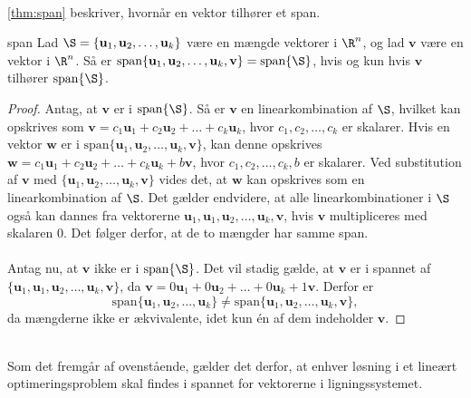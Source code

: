 \\
%
%
\ref{thm:span} beskriver, hvornår en vektor tilhører et span.
%
\begin{thm}{}{span}
%
Lad $\S =  \{ \mathbf{u}_1, \mathbf{u}_2 , \ldots , \mathbf{u}_k \}$ være en mængde vektorer i $\R^n$, og lad $\mathbf{v}$ være en vektor i $\R^n$.
Så er $\text{span}\{ \mathbf{u}_1, \mathbf{u}_2 , \ldots , \mathbf{u}_k , \mathbf{v}\} =\text{span}\{\S\}$, hvis og kun hvis $\mathbf{v}$ tilhører $\text{span}\{\S\}$.
%
\end{thm}
%
%
\begin{proof}
%
Antag, at $\mathbf{v}$ er i $\text{span}\{\S\}$. Så er $\mathbf{v}$ en linearkombination af $\S$, hvilket kan opskrives som $\mathbf{v}=c_1\mathbf{u}_1+c_2\mathbf{u}_2+ \ldots + c_k\mathbf{u}_k$, hvor $c_1,c_2,\ldots, c_k$ er skalarer. 
Hvis en vektor $\mathbf{w}$ er i $\text{span}\{ \mathbf{u}_1, \mathbf{u}_2 , \ldots , \mathbf{u}_k , \mathbf{v}\}$, 
kan denne opskrives $\mathbf{w}=c_1\mathbf{u}_1+c_2\mathbf{u}_2+ \ldots + c_k\mathbf{u}_k+b\mathbf{v}$, hvor $c_1,c_2,\ldots, c_k, b$ er skalarer.
Ved substitution af $\mathbf{v}$ med $\{ \mathbf{u}_1, \mathbf{u}_2 , \ldots , \mathbf{u}_k , \mathbf{v}\}$ vides det, at $\mathbf{w}$ kan opskrives som en linearkombination af $\S$.
Det gælder endvidere, at alle linearkombinationer i $\S$ også kan dannes fra vektorerne $\mathbf{u}_1,\mathbf{u}_1, \mathbf{u}_2 , \ldots , \mathbf{u}_k , \mathbf{v}$, hvis $\mathbf{v}$ multipliceres med skalaren $0$.
Det følger derfor, at de to mængder har samme span. \\\\
%
Antag nu, at $\textbf{v}$ ikke er i $\text{span}\{\S\}$. 
Det vil stadig gælde, at $\mathbf{v}$ er i spannet af 
$\{ \mathbf{u}_1,\mathbf{u}_1, \mathbf{u}_2 , \ldots , \mathbf{u}_k , \mathbf{v}\}$, da 
$\mathbf{v}=0\mathbf{u}_1+0\mathbf{u}_2+ \ldots + 0\mathbf{u}_k+1\mathbf{v}$.
Derfor er
$$\text{span}\{ \mathbf{u}_1, \mathbf{u}_2 , \ldots , \mathbf{u}_k \}
\neq
\text{span}\{ \mathbf{u}_1, \mathbf{u}_2 , \ldots , \mathbf{u}_k , \mathbf{v}\},$$ 
da mængderne ikke er ækvivalente, idet kun én af dem indeholder $\mathbf{v}$. 
%
\end{proof}
\\
%
%
Som det fremgår af ovenstående, gælder det derfor, at enhver løsning i et lineært optimeringsproblem skal findes i spannet for vektorerne i ligningssystemet. 
%
